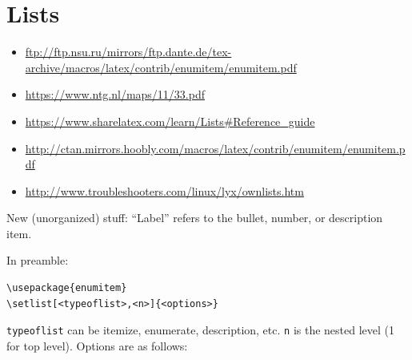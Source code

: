 \documentclass{article}
\begin{document}
\section{Lists}
\begin{itemize}
    \item \url{ftp://ftp.nsu.ru/mirrors/ftp.dante.de/tex-archive/macros/latex/contrib/enumitem/enumitem.pdf}
    \item \url{https://www.ntg.nl/maps/11/33.pdf}
    \item \url{https://www.sharelatex.com/learn/Lists#Reference_guide}
    \item \url{http://ctan.mirrors.hoobly.com/macros/latex/contrib/enumitem/enumitem.pdf}
    \item \url{http://www.troubleshooters.com/linux/lyx/ownlists.htm}
\end{itemize}

New (unorganized) stuff:
``Label'' refers to the bullet, number, or description item.

In preamble:
\begin{verbatim}
\usepackage{enumitem}
\setlist[<typeoflist>,<n>]{<options>}
\end{verbatim}
\verb|typeoflist| can be itemize, enumerate, description, etc.
\verb|n| is the nested level (1 for top level). Options are as follows:
\end{document}
